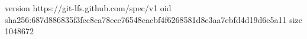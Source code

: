 version https://git-lfs.github.com/spec/v1
oid sha256:687d886835f3fcc8ca78eec76548cacbf4f6268581d8e3aa7ebfd4d19d6e5a11
size 1048672
